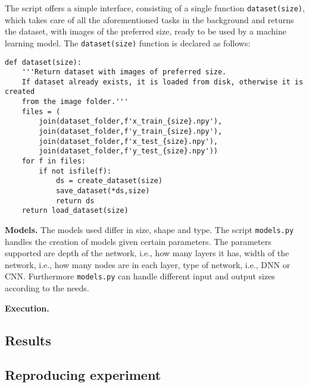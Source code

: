 The script offers a simple interface, consisting of a single function \texttt{dataset(size)}, which takes care of all the aforementioned tasks in the background and returns the dataset, with images of the preferred size, ready to be used by a machine learning model. The \texttt{dataset(size)} function is declared as follows:
\begin{verbatim}
def dataset(size):
    '''Return dataset with images of preferred size.
    If dataset already exists, it is loaded from disk, otherwise it is created
    from the image folder.'''
    files = (
        join(dataset_folder,f'x_train_{size}.npy'),
        join(dataset_folder,f'y_train_{size}.npy'),
        join(dataset_folder,f'x_test_{size}.npy'),
        join(dataset_folder,f'y_test_{size}.npy'))
    for f in files:
        if not isfile(f):
            ds = create_dataset(size)
            save_dataset(*ds,size)
            return ds
    return load_dataset(size)
\end{verbatim}

\textbf{Models.} The models used differ in size, shape and type. The script \texttt{models.py} handles the creation of models given certain parameters. The parameters supported are depth of the network, i.e., how many layers it has, width of the network, i.e., how many nodes are in each layer, type of network, i.e., DNN or CNN. Furthermore \texttt{models.py} can handle different input and output sizes according to the needs.

\textbf{Execution.}

\subsection{Results}

\subsection{Reproducing experiment}
